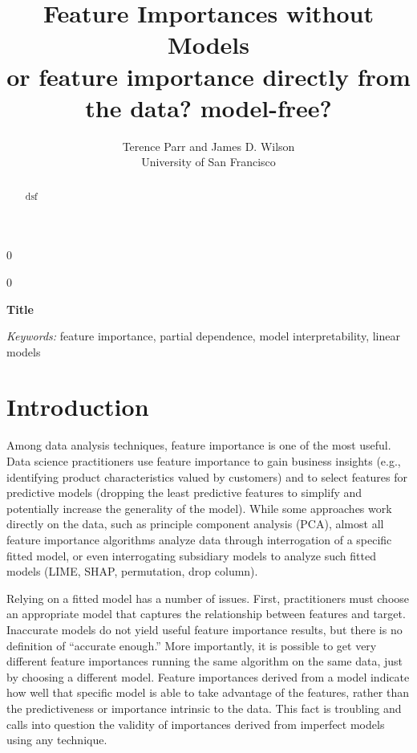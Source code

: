 \documentclass[12pt]{article}
\newcommand{\blind}{0}
\begin{document}
\def\spacingset#1{\renewcommand{\baselinestretch}%
{#1}\small\normalsize} \spacingset{1}



\blind
{
  \title{\bf Feature Importances without Models\\
  {\small or feature importance directly from the data? model-free?}}

  \author{Terence Parr and James D. Wilson\\
      University of San Francisco\\
}
  \maketitle
} \fi

\blind
{
  \bigskip
  \bigskip
  \bigskip
  \begin{center}
    {\LARGE\bf Title}
\end{center}
  \medskip
} \fi

\bigskip
\begin{abstract}
dsf
\end{abstract}

\noindent%
{\it Keywords:} feature importance, partial dependence, model interpretability, linear models

\section{Introduction}
\label{sec:intro}

Among data analysis techniques, feature importance is one of the most  useful. Data science practitioners use feature importance to gain business insights (e.g., identifying product characteristics valued by customers) and to select features for predictive models (dropping the least predictive features to simplify and potentially increase the generality of the model). While some approaches work directly on the data, such as principle component analysis (PCA), almost all feature importance algorithms analyze data through interrogation of a specific  fitted model, or even interrogating subsidiary models to analyze such fitted models (LIME, SHAP, permutation, drop column).

Relying on a fitted model has a number of issues. First, practitioners must choose an appropriate model that captures the relationship between features and target. Inaccurate models do not yield useful feature importance results, but there is no definition of ``accurate enough.'' More importantly, it is possible to get very different feature importances running the same algorithm on the same data, just by choosing a different model. Feature importances derived from a model indicate how well that specific model is able to take advantage of the features, rather than the predictiveness or importance intrinsic to the data.  This fact is troubling and calls into question the validity of importances derived from imperfect models using any technique.  
\end{document}
